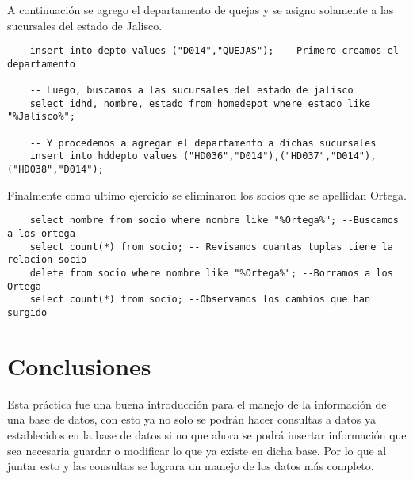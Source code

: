 \documentclass[12pt, titlepage]{article}
\begin{document}
	A continuación se agrego el departamento de quejas y se asigno solamente a las sucursales del estado de Jalisco.
	\begin{lstlisting}
	insert into depto values ("D014","QUEJAS"); -- Primero creamos el departamento
	
	-- Luego, buscamos a las sucursales del estado de jalisco
	select idhd, nombre, estado from homedepot where estado like "%Jalisco%";
	
	-- Y procedemos a agregar el departamento a dichas sucursales
	insert into hddepto values ("HD036","D014"),("HD037","D014"), ("HD038","D014");
	\end{lstlisting}
	
	
	Finalmente como ultimo ejercicio se eliminaron los socios que se apellidan Ortega.
	\begin{lstlisting}
	select nombre from socio where nombre like "%Ortega%"; --Buscamos a los ortega
	select count(*) from socio; -- Revisamos cuantas tuplas tiene la relacion socio
	delete from socio where nombre like "%Ortega%"; --Borramos a los Ortega
	select count(*) from socio; --Observamos los cambios que han surgido
	\end{lstlisting}
	\section{Conclusiones}
	Esta práctica fue una buena introducción para el manejo de la información de una base de datos, con esto ya no solo se podrán hacer consultas a datos ya establecidos en la base de datos si no que ahora se podrá insertar información que sea necesaria guardar o modificar lo que ya existe en dicha base. Por lo que al juntar esto y las consultas se lograra un manejo de los datos más completo.
	 
	
\end{document}
